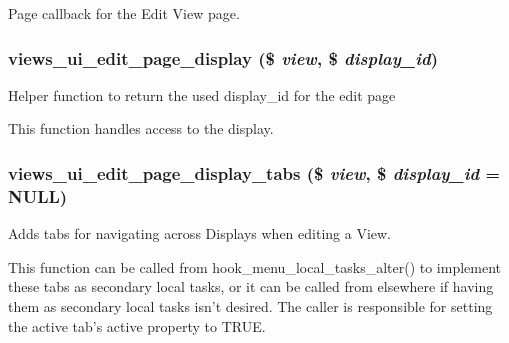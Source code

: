 \label{admin_8inc_ac6af463750fb21984d42b858c446635c}
Page callback for the Edit View page. \hypertarget{admin_8inc_a045ae05a3c8355d168425698b57a44ad}{
\subsubsection[{views\_\-ui\_\-edit\_\-page\_\-display}]{\setlength{\rightskip}{0pt plus 5cm}views\_\-ui\_\-edit\_\-page\_\-display (\$ {\em view}, \/  \$ {\em display\_\-id})}}
\label{admin_8inc_a045ae05a3c8355d168425698b57a44ad}
Helper function to return the used display\_\-id for the edit page

This function handles access to the display. \hypertarget{admin_8inc_af68377c9cd423a44378278947ce082c0}{
\subsubsection[{views\_\-ui\_\-edit\_\-page\_\-display\_\-tabs}]{\setlength{\rightskip}{0pt plus 5cm}views\_\-ui\_\-edit\_\-page\_\-display\_\-tabs (\$ {\em view}, \/  \$ {\em display\_\-id} = {\ttfamily NULL})}}
\label{admin_8inc_af68377c9cd423a44378278947ce082c0}
Adds tabs for navigating across Displays when editing a View.

This function can be called from hook\_\-menu\_\-local\_\-tasks\_\-alter() to implement these tabs as secondary local tasks, or it can be called from elsewhere if having them as secondary local tasks isn't desired. The caller is responsible for setting the active tab's active property to TRUE.



